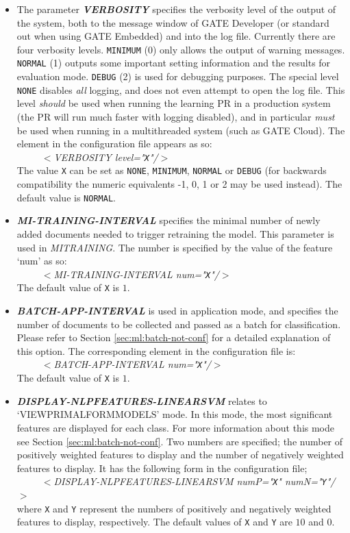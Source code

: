 \begin{itemize}
\item The parameter {\em {\bf VERBOSITY}} specifies the verbosity level of the
output of the system, both to the message window of GATE Developer (or standard
out when using GATE Embedded) and into the log file.  Currently there are
four verbosity levels. \texttt{MINIMUM} (0) only allows the output of
warning messages.  \texttt{NORMAL} (1) outputs some important setting
information and the results for evaluation mode. \texttt{DEBUG} (2) is
used for debugging purposes. The special level \texttt{NONE} disables {\em all}
logging, and does not even attempt to open the log file.  This level
{\em should} be used when running the learning PR in a production system (the
PR will run much faster with logging disabled), and in particular {\em must} be
used when running in a multithreaded system (such as GATE Cloud).  The
element in the configuration file appears as so:\\
\ \ \ \ \ {\em $<$VERBOSITY level="\texttt{X}"/$>$}\\
The value \texttt{X} can be set as \texttt{NONE}, \texttt{MINIMUM},
\texttt{NORMAL} or \texttt{DEBUG} (for backwards compatibility the numeric
equivalents -1, 0, 1 or 2 may be used instead). The default value is
\texttt{NORMAL}.

\item {\em {\bf MI-TRAINING-INTERVAL}} specifies the minimal number 
of newly added documents needed to trigger retraining the model. This
parameter is used in {\em MITRAINING}. The number is specified by the
value of the feature `num' as so:\\
\ \ \ \ \ {\em $<$MI-TRAINING-INTERVAL num="\texttt{X}"/$>$} \\
The default value of \texttt{X} is $1$.

\item {\em {\bf BATCH-APP-INTERVAL}} is used in application mode, and
specifies the number of documents to be collected and passed as a
batch for classification. Please refer to Section \ref{sec:ml:batch-not-conf}
for a detailed explanation of this option. The corresponding element in
the configuration file is:\\
\ \ \ \ \ {\em $<$BATCH-APP-INTERVAL num="\texttt{X}"/$>$}\\
The default value of \texttt{X} is $1$.

\item {\em {\bf DISPLAY-NLPFEATURES-LINEARSVM}} relates to
`VIEWPRIMALFORMMODELS' mode. In this mode, the most significant features are
displayed for each class. For more information about this mode see Section
\ref{sec:ml:batch-not-conf}. Two numbers are specified; the number of positively
weighted features to display and the number of negatively weighted features to
display. It has the following form
in the configuration file;\\
\ \ \ \ \ {\em $<$DISPLAY-NLPFEATURES-LINEARSVM numP="\texttt{X}" numN="\texttt{Y}"/$>$}\\
where \texttt{X} and \texttt{Y} represent the numbers of positively and
negatively weighted features to display, respectively. The default values of
\texttt{X} and \texttt{Y} are $10$ and $0$.


\end{itemize}
